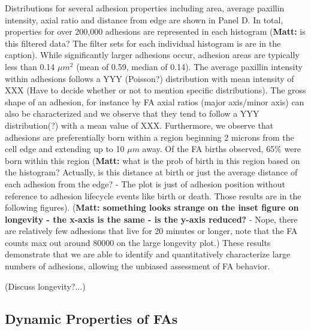 \documentclass[10pt]{article}
\begin{document}
Distributions for several adhesion properties including area, average paxillin
intensity, axial ratio and distance from edge are shown in Panel D. In total,
properties for over 200,000 adhesions are represented in each histogram
(\textbf{Matt:} is this filtered data? The filter sets for each individual
histogram is are in the caption). While significantly larger adhesions occur,
adhesion areas are typically less than 0.14 $\mu m^2$ (mean of 0.59, median of
0.14).  The average paxillin intensity within adhesions follows a YYY (Poisson?)
distribution with mean intensity of XXX (Have to decide whether or not to
mention specific distributions). The gross shape of an adhesion, for instance by
FA axial ratios (major axis/minor axis) can also be characterized and we observe
that they tend to follow a YYY distribution(?) with a mean value of XXX.
Furthermore, we observe that adhesions are preferentially born within a region
beginning 2 microns from the cell edge and extending up to 10 $\mu m$ away. Of
the FA births observed, 65\% were born within this region (\textbf{Matt:} what
is the prob of birth in this region based on the histogram? Actually, is this
distance at birth or just the average distance of each adhesion from the edge? -
The plot is just of adhesion position without reference to adhesion lifecycle
events like birth or death. Those results are in the following figures).
(\textbf{Matt: something looks strange on the inset figure on longevity - the
x-axis is the same - is the y-axis reduced?} - Nope, there are relatively few
adhesions that live for 20 minutes or longer, note that the FA counts max out
around 80000 on the large longevity plot.) These results demonstrate that we are
able to identify and quantitatively characterize large numbers of adhesions,
allowing the unbiased assessment of FA behavior.

(Discuss longevity?...)

\subsection*{Dynamic Properties of FAs}
\end{document}
